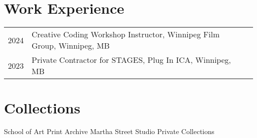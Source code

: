 \documentclass[12pt]{article}
\begin{document}
\begin{flushleft}
\section{Work Experience}
\begin{tabular}{@{}lll}
2024 & Creative Coding Workshop Instructor, Winnipeg Film Group, Winnipeg, MB \\
2023 & Private Contractor for STAGES, Plug In ICA, Winnipeg, MB
\end{tabular}
\section{Collections}
School of Art Print Archive
Martha Street Studio
Private Collections
\end{flushleft}
\end{document}
